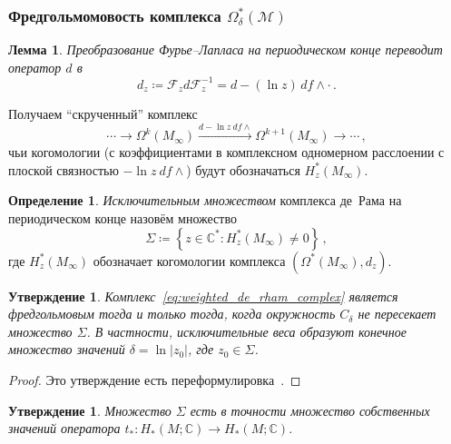 \documentclass[a4paper, 12pt]{article}
\newtheorem{lemma}[theorem]{Лемма}
\newtheorem{proposition}[theorem]{Утверждение}
\theoremstyle{definition}
\newtheorem{definition}[theorem]{Определение}
\begin{document}
\subsubsection{Фредгольмомовость комплекса \({ \Omega_{\delta}^{*}(\mathcal M) }\)}

\begin{lemma}
    \label{lem:twisted_de_rham_differential}
    Преобразование Фурье--Лапласа на периодическом конце переводит оператор $d$ в
    \begin{equation}
        \label{eq:twisted_differential}
        d_z \coloneqq \mathcal F_{z} d \mathcal F_{z}^{-1} = d - (\ln z)\, df \wedge \cdot\,.
    \end{equation}
\end{lemma}

Получаем ``скрученный'' комплекс \[
    \cdots \to \Omega^{k}(M_{\infty}) \xrightarrow{d - \ln z\: df \land} \Omega^{k+1}(M_{\infty}) \to \cdots\,,
\] чьи когомологии (с коэффициентами в комплексном одномерном расслоении с плоской связностью \({ -\ln z\: df \land }\)) будут обозначаться \({ H_{z}^{*}(M_{\infty}) }\).

\begin{definition}
    \label{def:exceptional_set}
    \emph{Исключительным множеством} комплекса де~Рама на периодическом конце назовём множество
    \[
        \Sigma \coloneqq \left\{ z \in \mathbb C^* : H^{*}_z(M_{\infty}) \neq 0 \right\}\,,
    \]
    где $H^{*}_z(M_{\infty})$ обозначает когомологии комплекса $(\Omega^{*}(M_{\infty}), d_z)$.
\end{definition}

\begin{proposition}
    \label{prop:fredholm_criterion_derham}
    Комплекс~\eqref{eq:weighted_de_rham_complex} является фредгольмовым тогда и только тогда, когда окружность $C_{\delta}$ не пересекает множество $\Sigma$. В частности, исключительные веса образуют конечное множество значений $\delta = \ln |z_0|$, где $z_0 \in \Sigma$.
\end{proposition}

\begin{proof}
    Это утверждение есть переформулировка~\cite[Propositions 2.1 \& 2.2]{mrowka2015index}.
\end{proof}

\begin{proposition}
    \label{prop:explicit_description_of_the_critical_set}
    Множество \({ \Sigma }\) есть в точности множество собственных значений оператора \({ t_{*} : H_{*}(M; \mathbb C) \to H_{*}(M; \mathbb C) }\).
\end{proposition}
\end{document}
